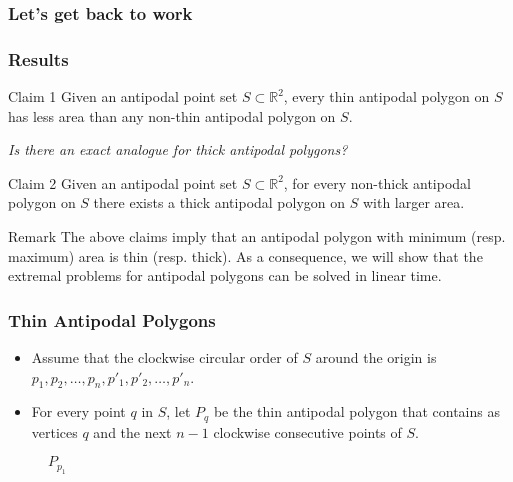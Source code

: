 \documentclass{beamer}
\newcommand{\R}{\mathbb{R}}
\begin{document}
\begin{frame}
\frametitle{Let's get back to work}
\begin{figure}
\end{figure}
\end{frame}

\begin{frame}
\frametitle{Results}
\begin{alertblock}{Claim 1}
Given an antipodal point set $S \subset \R^2$, every thin antipodal polygon on $S$ has
less area than any non-thin antipodal polygon on $S$.
\end{alertblock}\pause
\vspace{1cm}

\emph{Is there an exact analogue for thick antipodal polygons?}

\end{frame}

\begin{frame}
\begin{alertblock}{Claim 2}
Given an antipodal point set $S \subset \R^2$, for every non-thick antipodal polygon
on $S$ there exists a thick antipodal polygon on $S$ with larger area.
\end{alertblock}\pause

\begin{figure}
\end{figure}
\end{frame}

\begin{frame}
\begin{block}{Remark}
The above claims imply that an antipodal polygon with minimum (resp. maximum)
area is thin (resp. thick). As a consequence, we will show that the extremal
problems for antipodal polygons can be solved in linear time.

\end{block}
\end{frame}


\begin{frame}
\frametitle{Thin Antipodal Polygons}

\begin{itemize}
\item<1-> Assume that the clockwise circular order of $S$ around the origin is $p_1, p_2, \dots , p_n,
p'_1, p'_2,\dots , p'_n$.
\item<2-> For every point $q$ in $S$, let $P_q$ be the thin antipodal polygon that
contains as vertices $q$ and the next $n-1$ clockwise consecutive points of $S$.
\end{itemize}\pause

\begin{figure}
\caption{$P_{p_1}$}
\end{figure}
\end{frame}
\end{document}
